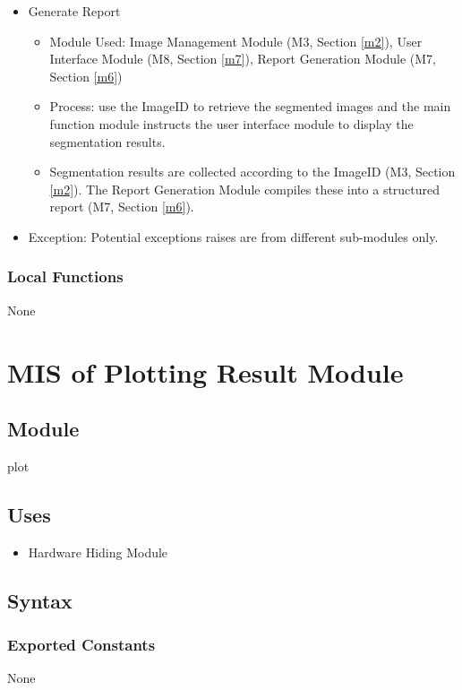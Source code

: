 \documentclass[12pt, titlepage]{article}
\begin{document}
\begin{itemize}
\item Generate Report
    \begin{itemize}
        \item  Module Used: Image Management Module (M3, Section \ref{m2}), User Interface Module (M8, Section \ref{m7}), Report Generation Module (M7, Section \ref{m6})
        \item Process: use the ImageID to retrieve the segmented images and the main function module instructs the user interface module to display the segmentation results.
        \item Segmentation results are collected according to the ImageID (M3, Section \ref{m2}). The Report Generation Module compiles these into a structured report (M7, Section \ref{m6}).
    \end{itemize}

\item Exception: Potential exceptions raises are from different sub-modules only.   
\end{itemize}


\subsubsection{Local Functions}

None

\newpage
\section{MIS of Plotting Result Module} \label{Plotting_Result_Module} 

\subsection{Module}
plot

\subsection{Uses}

\begin{itemize}
    \item Hardware Hiding Module
\end{itemize}

\subsection{Syntax}

\subsubsection{Exported Constants}
None
\end{document}
